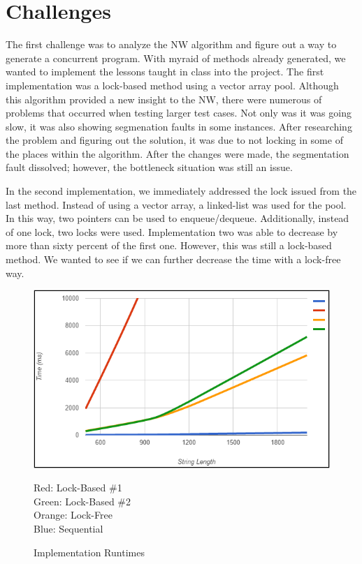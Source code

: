\documentclass[letterpaper, 10 pt, conference]{IEEEconf}
\begin{document}
\section{Challenges}
The first challenge was to analyze the NW algorithm and figure out a way to generate a concurrent program. With myraid of methods already generated, we wanted to implement the lessons taught in class into the project. The first implementation was a lock-based method using a vector array pool. Although this algorithm provided a new insight to the NW, there were numerous of problems that occurred when testing larger test cases. Not only was it was going slow, it was also showing segmenation faults in some instances. After researching the problem and figuring out the solution, it was due to not locking in some of the places within the algorithm. After the changes were made, the segmentation fault dissolved; however, the bottleneck situation was still an issue. 

In the second implementation, we immediately addressed the lock issued from the last method. Instead of using a vector array, a linked-list was used for the pool. In this way, two pointers can be used to enqueue/dequeue. Additionally, instead of one lock, two locks were used. Implementation two was able to decrease by more than sixty percent of the first one. However, this was still a lock-based method. We wanted to see if we can further decrease the time with a lock-free way. 


\begin{figure}
	\centering
	\includegraphics[scale=0.6]{sequential_vs_parallel}
	\caption{Implementation Runtimes}
	\medskip
	\small
	Red: Lock-Based \#1\\ Green: Lock-Based \#2\\ Orange: Lock-Free\\ Blue: Sequential    
\end{figure}
\end{document}
